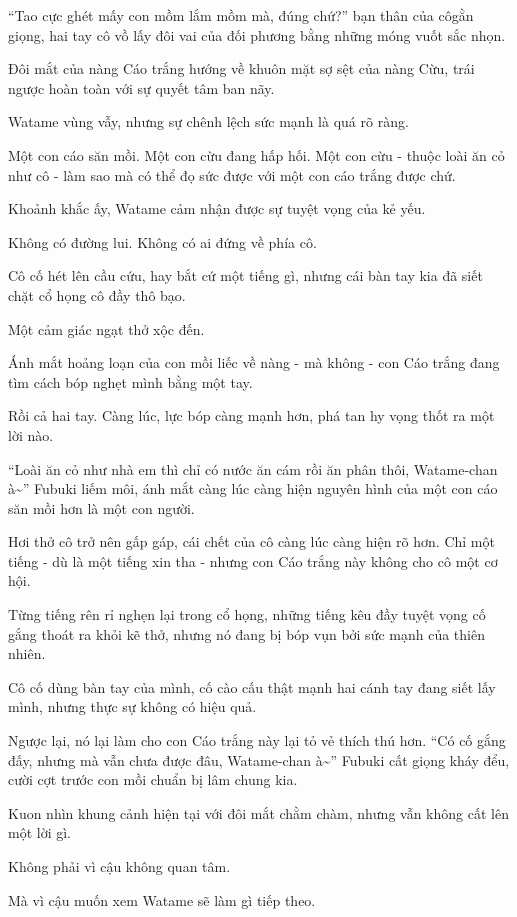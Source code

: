 \documentclass[../main.tex]{subfiles}
\begin{document}
``Tao cực ghét mấy con mồm lắm mồm mà, đúng chứ?'' bạn thân của côgằn giọng, hai tay cô vồ lấy đôi vai của đối phương bằng những móng vuốt sắc nhọn.

Đôi mắt của nàng Cáo trắng hướng về khuôn mặt sợ sệt của nàng Cừu, trái ngược hoàn toàn với sự quyết tâm ban nãy.

Watame vùng vẫy, nhưng sự chênh lệch sức mạnh là quá rõ ràng.

Một con cáo săn mồi. Một con cừu đang hấp hối. Một con cừu - thuộc loài ăn cỏ như cô - làm sao mà có thể đọ sức được với một con cáo trắng được chứ.

Khoảnh khắc ấy, Watame cảm nhận được sự tuyệt vọng của kẻ yếu.

Không có đường lui. Không có ai đứng về phía cô.

Cô cố hét lên cầu cứu, hay bắt cứ một tiếng gì, nhưng cái bàn tay kia đã siết chặt cổ họng cô đầy thô bạo.

Một cảm giác ngạt thở xộc đến.

Ánh mắt hoảng loạn của con mồi liếc về nàng - mà không - con Cáo trắng đang tìm cách bóp nghẹt mình bằng một tay.

Rồi cả hai tay. Càng lúc, lực bóp càng mạnh hơn, phá tan hy vọng thốt ra một lời nào.

``Loài ăn cỏ như nhà em thì chỉ có nước ăn cám rồi ăn phân thôi, Watame-chan à\~{}'' Fubuki liếm môi, ánh mắt càng lúc càng hiện nguyên hình của một con cáo săn mồi hơn là một con người.

Hơi thở cô trở nên gấp gáp, cái chết của cô càng lúc càng hiện rõ hơn. Chỉ một tiếng - dù là một tiếng xin tha - nhưng con Cáo trắng này không cho cô một cơ hội.

Từng tiếng rên rỉ nghẹn lại trong cổ họng, những tiếng kêu đầy tuyệt vọng cố gắng thoát ra khỏi kẽ thở, nhưng nó đang bị bóp vụn bởi sức mạnh của thiên nhiên.

Cô cố dùng bàn tay của mình, cố cào cấu thật mạnh hai cánh tay đang siết lấy mình, nhưng thực sự không có hiệu quả.

Ngược lại, nó lại làm cho con Cáo trắng này lại tỏ vẻ thích thú hơn. ``Có cố gắng đấy, nhưng mà vẫn chưa được đâu, Watame-chan à\~{}'' Fubuki cất giọng kháy đểu, cười cợt trước con mồi chuẩn bị lâm chung kia.

Kuon nhìn khung cảnh hiện tại với đôi mắt chằm chàm, nhưng vẫn không cất lên một lời gì.

Không phải vì cậu không quan tâm.

Mà vì cậu muốn xem Watame sẽ làm gì tiếp theo.
\end{document}
